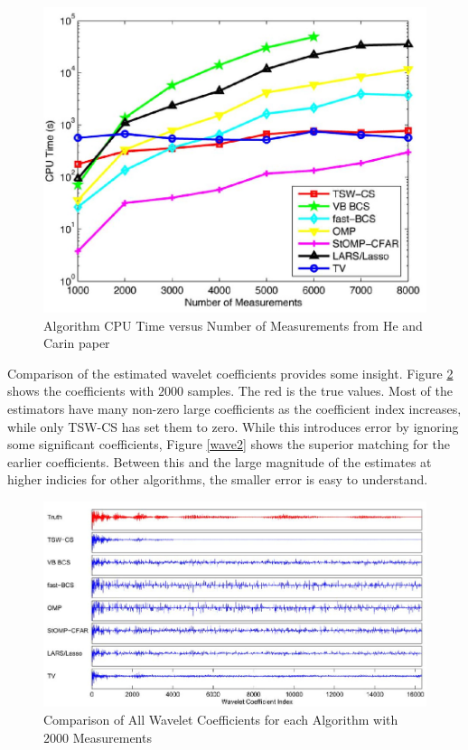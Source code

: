 \documentclass{IEEEtran}
\begin{document}
\begin{figure}[ht]
  \centering
  \includegraphics[width=1\linewidth]{he_carin_speed}
  \caption{Algorithm CPU Time versus Number of Measurements from He and Carin paper}
  \label{cputime}
\end{figure}

Comparison of the estimated wavelet coefficients provides some
insight.  Figure \ref{wave1} shows the coefficients with $2000$
samples.  The red is the true values.  Most of the estimators have
many non-zero large coefficients as the coefficient index increases,
while only TSW-CS has set them to zero.  While this introduces error
by ignoring some significant coefficients, Figure \ref{wave2} shows
the superior matching for the earlier coefficients.  Between this and
the large magnitude of the estimates at higher indicies for other
algorithms, the smaller error is easy to understand.

\begin{figure}[ht]
  \centering
  \includegraphics[width=1\linewidth]{he_carin_wavelet_whole}
  \caption{Comparison of All Wavelet Coefficients for each Algorithm
    with $2000$ Measurements}
  \label{wave1}
\end{figure}
\end{document}
